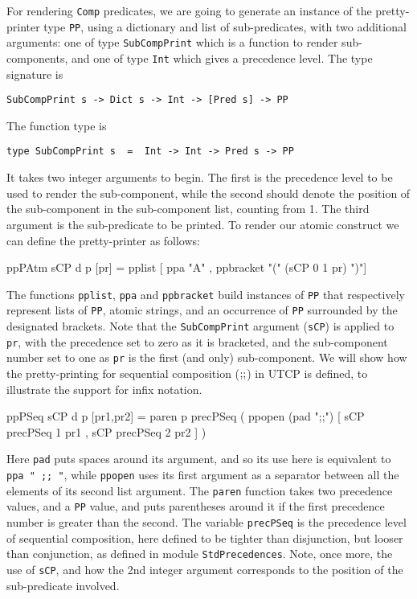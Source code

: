 For rendering \texttt{Comp} predicates,
we are going to generate an instance
of the pretty-printer type \texttt{PP}, using a dictionary
and list of sub-predicates,
with two additional arguments:
one of type \texttt{SubCompPrint} which
is a function to render sub-components,
and one of type \texttt{Int} which gives a precedence level.
The type signature is
\begin{verbatim}
SubCompPrint s -> Dict s -> Int -> [Pred s] -> PP
\end{verbatim}
The function type is
\begin{verbatim}
type SubCompPrint s  =  Int -> Int -> Pred s -> PP
\end{verbatim}
It takes two integer arguments to begin.
The first is the precedence level to be used to render the
sub-component,
while the second should denote the position of the sub-component
in the sub-component list, counting from 1.
The third argument is the sub-predicate to be printed.
To render our atomic construct we can define the pretty-printer
as follows:
\begin{code}
ppPAtm sCP d p [pr]
       = pplist [ ppa "A" , ppbracket "(" (sCP 0 1 pr) ")"]
\end{code}
The functions \texttt{pplist}, \texttt{ppa} and \texttt{ppbracket}
build instances of \texttt{PP}
that respectively represent lists of \texttt{PP},
atomic strings,
and an occurrence of \texttt{PP} surrounded by the designated brackets.
Note that the \texttt{SubCompPrint} argument (\texttt{sCP})
is applied to \texttt{pr},
with the precedence set to zero as it is bracketed,
and the sub-component number set to one as \texttt{pr} is the first
(and only) sub-component.
We will show how the pretty-printing for
sequential composition ($\mathrel{\mathbf{;\!;}}$) in UTCP is defined,
to illustrate the support for infix notation.
\begin{code}
ppPSeq sCP d  p [pr1,pr2]
 = paren p precPSeq
     ( ppopen  (pad ";;") [ sCP precPSeq 1 pr1
                          , sCP precPSeq 2 pr2 ] )
\end{code}
Here \texttt{pad} puts spaces around its argument,
and so its use here is equivalent to \verb$ppa " ;; "$,
while \texttt{ppopen} uses its first argument as a
separator between all the elements of its second list argument.
The \texttt{paren} function takes two precedence values,
and a \texttt{PP} value, and puts parentheses around it if the first precedence
number is greater than the second.
The variable \texttt{precPSeq} is the precedence level of sequential composition,
here defined to be tighter than disjunction,
but looser than conjunction, as defined in module \texttt{StdPrecedences}.
Note, once more, the use of \texttt{sCP}, and how the 2nd integer argument
corresponds to the position of the sub-predicate involved.

